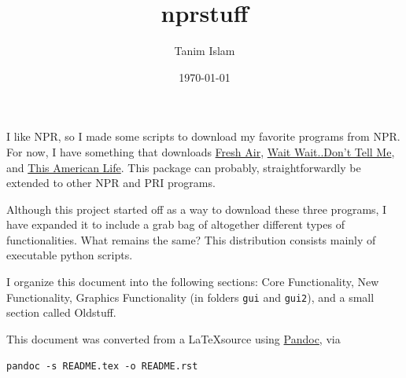 \documentclass[]{article}
\title{nprstuff}
\date{\today}
\author{Tanim Islam}
\begin{document}
\maketitle

I like NPR, so I made some scripts to download my favorite programs from NPR. For now, I have something that downloads \href{http://www.npr.org/programs/fresh-air/}{Fresh Air},
\href{http://www.npr.org/programs/wait-wait-dont-tell-me/}{Wait Wait..Don't Tell Me}, and \href{http://www.thisamericanlife.org/}{This American Life}. This package can probably, straightforwardly be extended to other NPR and PRI programs.

Although this project started off as a way to download these three programs, I have expanded it to include a grab bag of altogether different types of functionalities. What remains the same? This distribution consists mainly of executable python scripts.

I organize this document into the following sections: Core Functionality, New Functionality, Graphics Functionality (in folders {\verb|gui|} and {\verb|gui2|}), and a small section called Oldstuff.

This document was converted from a \LaTeX source using \href{http://pandoc.org/index.html}{Pandoc}, via
\begin{verbatim}
pandoc -s README.tex -o README.rst
\end{verbatim}
\end{document}
